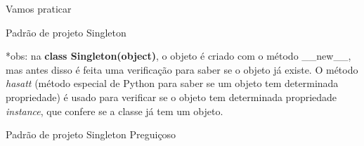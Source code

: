 \begin{frame}[t]{Vamos praticar}
	\vspace{1em}
	\centering
\end{frame}


\begin{frame}[t]{Padrão de projeto Singleton}

	

	*obs: na \textbf{class Singleton(object)}, o objeto é criado com o método \_\_new\_\_, mas antes disso é feita uma verificação para saber se o objeto já existe. O método \textit{hasatt} (método especial de Python para saber se um objeto tem determinada propriedade) é usado para verificar se o objeto tem determinada propriedade \textit{instance}, que confere se a classe já tem um objeto.

\end{frame}


\begin{frame}[t]{Padrão de projeto Singleton Preguiçoso}
	
	
	\fontsize{12pt}{15.2}\selectfont{
		Instanciação preguiçosa no padrão Singleton.
		
	}\par
	\vspace{1em}
	
	
	\fontsize{12pt}{15}\selectfont{
		\begin{itemize}%
			
			\item A instanciação preguiçosa garante que o objeto seja criado quando realmente precisamos dele.
			
			\item Considere a instanciação preguiçosa como uma maneira de trabalhar como recursos reduzidos e criá-los somente quando houver necessidade.
		\end{itemize}
	}\par
	\vspace{1em}
	
\end{frame}


